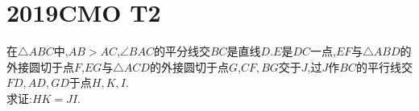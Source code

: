 \documentclass[]{article}
\title{}
\author{}
\date{}
\begin{document}
\maketitle
\section{2019CMO T2}{
在$\triangle ABC$中,$AB>AC$,$\angle BAC$的平分线交$BC$是直线$D$.$E$是$DC$一点,$EF$与$\triangle ABD$的外接圆切于点$F$,$EG$与$\triangle ACD$的外接圆切于点$G$,$CF,BG$交于$J$,过$J$作$BC$的平行线交$FD,AD,GD$于点$H,K,I$.\\
求证:$HK=JI$.
}
\end{document}
